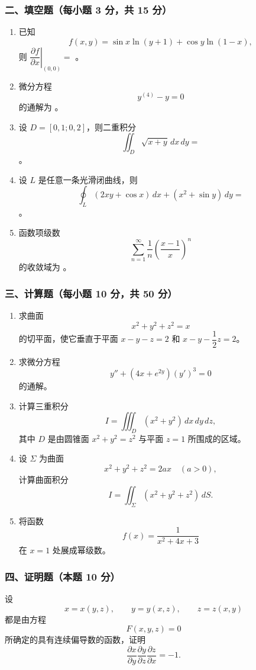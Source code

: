 \subsubsection*{二、填空题（每小题 3 分，共 15 分）}
\begin{enumerate}
  \item 已知
  \[
  f(x,y)=\sin x\ln(y+1)+\cos y\ln(1-x),
  \]
  则 $\left.\dfrac{\partial f}{\partial x}\right|_{(0,0)}=$ \underline{\hspace{3cm}}。
  \item 微分方程
  \[
  y^{(4)}-y=0
  \]
  的通解为 \underline{\hspace{4cm}}。
  \item 设 $D=[0,1;0,2]$，则二重积分
  \[
  \iint_D\sqrt{x+y}\,dx\,dy=
  \]
  \underline{\hspace{3cm}}。
  \item 设 $L$ 是任意一条光滑闭曲线，则
  \[
  \oint_L(2xy+\cos x)\,dx+(x^2+\sin y)\,dy=
  \]
  \underline{\hspace{3cm}}。
  \item 函数项级数
  \[
  \sum_{n=1}^{\infty}\frac1n\left(\frac{x-1}{x}\right)^n
  \]
  的收敛域为 \underline{\hspace{4cm}}。
\end{enumerate}

\subsubsection*{三、计算题（每小题 10 分，共 50 分）}
\begin{enumerate}
  \item 求曲面
  \[
  x^2+y^2+z^2=x
  \]
  的切平面，使它垂直于平面 $x-y-z=2$ 和 $x-y-\dfrac12z=2$。
  \item 求微分方程
  \[
  y''+(4x+e^{2y})(y')^3=0
  \]
  的通解。
  \item 计算三重积分
  \[
  I=\iiint_D(x^2+y^2)\,dx\,dy\,dz,
  \]
  其中 $D$ 是由圆锥面 $x^2+y^2=z^2$ 与平面 $z=1$ 所围成的区域。
  \item 设 $\Sigma$ 为曲面
  \[
  x^2+y^2+z^2=2ax\quad(a>0),
  \]
  计算曲面积分
  \[
  I=\iint_\Sigma(x^2+y^2+z^2)\,dS.
  \]
  \item 将函数
  \[
  f(x)=\frac1{x^2+4x+3}
  \]
  在 $x=1$ 处展成幂级数。
\end{enumerate}

\subsubsection*{四、证明题（本题 10 分）}
设
\[
x=x(y,z),\qquad y=y(x,z),\qquad z=z(x,y)
\]
都是由方程
\[
F(x,y,z)=0
\]
所确定的具有连续偏导数的函数，证明
\[
\frac{\partial x}{\partial y}\frac{\partial y}{\partial z}\frac{\partial z}{\partial x}=-1.
\]

